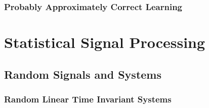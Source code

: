 \documentclass[11pt]{report} %
\begin{document}
\subsection{Probably Approximately Correct Learning}

\chapter{Statistical Signal Processing}

\section{Random Signals and Systems}

\subsection{Random Linear Time Invariant Systems}
\end{document}
